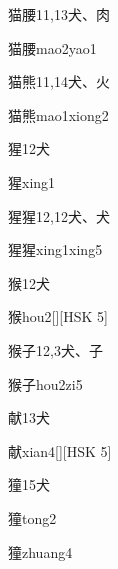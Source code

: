 \begin{Entry}{猫腰}{11,13}{⽝、⾁}
  \begin{Phonetics}{猫腰}{mao2yao1}
  \end{Phonetics}
\end{Entry}

\begin{Entry}{猫熊}{11,14}{⽝、⽕}
  \begin{Phonetics}{猫熊}{mao1xiong2}
  \end{Phonetics}
\end{Entry}

\begin{Entry}{猩}{12}{⽝}
  \begin{Phonetics}{猩}{xing1}
  \end{Phonetics}
\end{Entry}

\begin{Entry}{猩猩}{12,12}{⽝、⽝}
  \begin{Phonetics}{猩猩}{xing1xing5}
  \end{Phonetics}
\end{Entry}

\begin{Entry}{猴}{12}{⽝}
  \begin{Phonetics}{猴}{hou2}[][HSK 5]
  \end{Phonetics}
\end{Entry}

\begin{Entry}{猴子}{12,3}{⽝、⼦}
  \begin{Phonetics}{猴子}{hou2zi5}
  \end{Phonetics}
\end{Entry}

\begin{Entry}{献}{13}{⽝}
  \begin{Phonetics}{献}{xian4}[][HSK 5]
  \end{Phonetics}
\end{Entry}

\begin{Entry}{獞}{15}{⽝}
  \begin{Phonetics}{獞}{tong2}
  \end{Phonetics}
  \begin{Phonetics}{獞}{zhuang4}
  \end{Phonetics}
\end{Entry}


